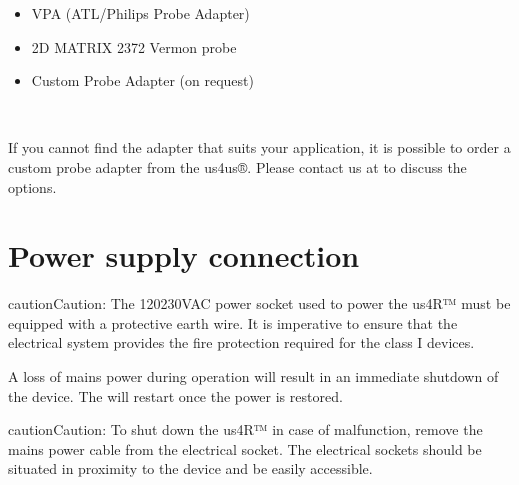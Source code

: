 \documentclass[letterpaper,10pt,english]{sphinxmanual}
\begin{document}
\begin{savenotes}
\begin{tabular}[t]{}
\begin{itemize}
\item {} 
\sphinxAtStartPar
VPA (ATL/Philips Probe Adapter)

\item {} 
\sphinxAtStartPar
2D MATRIX 2372 Vermon probe

\item {} 
\sphinxAtStartPar
Custom Probe Adapter (on request)

\end{itemize}
\\
\sphinxbottomrule
\end{tabular}
\sphinxtableafterendhook\par
\sphinxattableend\end{savenotes}

\sphinxAtStartPar
{}

\sphinxAtStartPar
{}

\sphinxAtStartPar
If you cannot find the adapter that suits your application, it is
possible to order a custom probe adapter from the us4us®. Please contact
us at  to discuss the options.


\chapter{Power supply connection}
\label{\detokenize{content/set-up:power-supply-connection}}
\begin{sphinxadmonition}{caution}{Caution:}
\sphinxAtStartPar
The 120\sphinxhyphen{}230VAC power socket used to power the us4R™ must be equipped with a protective earth wire. It is imperative to ensure that the electrical system provides the fire protection required for the class I devices.
\end{sphinxadmonition}

\sphinxAtStartPar
A loss of mains power during operation will result in an immediate
shutdown of the device. The  will restart once the power is
restored.

\begin{sphinxadmonition}{caution}{Caution:}
\sphinxAtStartPar
To shut down the us4R™ in case of malfunction, remove the mains power cable from the electrical socket. The electrical sockets should be situated in proximity to the device and be easily accessible.
\end{sphinxadmonition}
\end{document}
